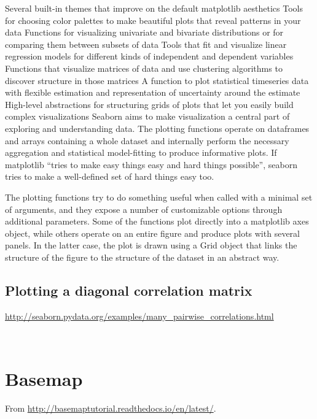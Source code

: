 \documentclass[11pt,a4paper]{article}
\begin{document}
Several built-in themes that improve on the default matplotlib aesthetics
Tools for choosing color palettes to make beautiful plots that reveal patterns in your data
Functions for visualizing univariate and bivariate distributions or for comparing them between subsets of data
Tools that fit and visualize linear regression models for different kinds of independent and dependent variables
Functions that visualize matrices of data and use clustering algorithms to discover structure in those matrices
A function to plot statistical timeseries data with flexible estimation and representation of uncertainty around the estimate
High-level abstractions for structuring grids of plots that let you easily build complex visualizations
Seaborn aims to make visualization a central part of exploring and understanding data. The plotting functions operate on dataframes and arrays containing a whole dataset and internally perform the necessary aggregation and statistical model-fitting to produce informative plots. If matplotlib “tries to make easy things easy and hard things possible”, seaborn tries to make a well-defined set of hard things easy too.

The plotting functions try to do something useful when called with a minimal set of arguments, and they expose a number of customizable options through additional parameters. Some of the functions plot directly into a matplotlib axes object, while others operate on an entire figure and produce plots with several panels. In the latter case, the plot is drawn using a Grid object that links the structure of the figure to the structure of the dataset in an abstract way.

    \subsection{Plotting a diagonal correlation matrix}
    \href{http://seaborn.pydata.org/examples/many_pairwise_correlations.html}{http://seaborn.pydata.org/examples/many\_pairwise\_correlations.html}\\
    
    \begin{lstlisting}
      
    \end{lstlisting}



\newpage
\section{Basemap}
From
\href{http://basemaptutorial.readthedocs.io/en/latest/}{http://basemaptutorial.readthedocs.io/en/latest/}.
\end{document}

